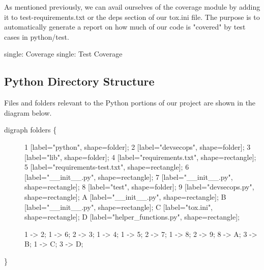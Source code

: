 As mentioned previously, we can avail ourselves of the coverage module
by adding it to test-requirements.txt or the deps section of our tox.ini
file. The purpose is to automatically generate a report on how much of
our code is "covered" by test cases in python/test.

single: Coverage single: Test Coverage

\hypertarget{python-directory-structure}{%
\subsection{Python Directory
Structure}\label{python-directory-structure}}

Files and folders relevant to the Python portions of our project are
shown in the diagram below.

\begin{description}
\item[digraph folders \{]
1 {[}label="python", shape=folder{]}; 2 {[}label="devsecops",
shape=folder{]}; 3 {[}label="lib", shape=folder{]}; 4
{[}label="requirements.txt", shape=rectangle{]}; 5
{[}label="requirements-test.txt", shape=rectangle{]}; 6
{[}label="\_\_init\_\_.py", shape=rectangle{]}; 7
{[}label="\_\_init\_\_.py", shape=rectangle{]}; 8 {[}label="test",
shape=folder{]}; 9 {[}label="devsecops.py", shape=rectangle{]}; A
{[}label="\_\_init\_\_.py", shape=rectangle{]}; B
{[}label="\_\_init\_\_.py", shape=rectangle{]}; C {[}label="tox.ini",
shape=rectangle{]}; D {[}label="helper\_functions.py",
shape=rectangle{]};

1 -\textgreater{} 2; 1 -\textgreater{} 6; 2 -\textgreater{} 3; 1
-\textgreater{} 4; 1 -\textgreater{} 5; 2 -\textgreater{} 7; 1
-\textgreater{} 8; 2 -\textgreater{} 9; 8 -\textgreater{} A; 3
-\textgreater{} B; 1 -\textgreater{} C; 3 -\textgreater{} D;
\end{description}

\}
